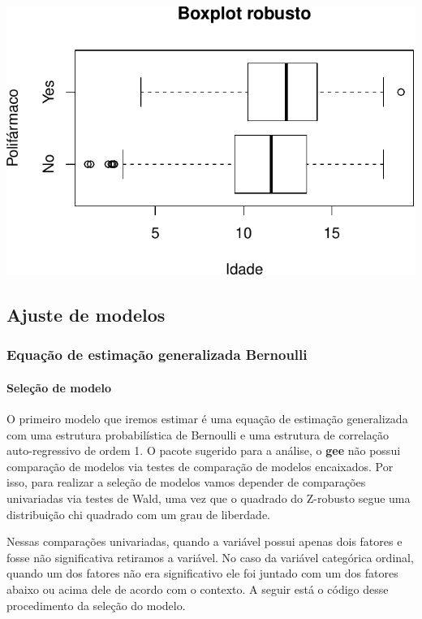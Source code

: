\documentclass[
  11pt,
]{article}
\begin{document}
\begin{center}\includegraphics{lista3_files/figure-latex/unnamed-chunk-3-1} \end{center}

\hypertarget{ajuste-de-modelos}{%
\subsection{Ajuste de modelos}\label{ajuste-de-modelos}}

\hypertarget{equauxe7uxe3o-de-estimauxe7uxe3o-generalizada-bernoulli}{%
\subsubsection{Equação de estimação generalizada Bernoulli}\label{equauxe7uxe3o-de-estimauxe7uxe3o-generalizada-bernoulli}}

\hypertarget{seleuxe7uxe3o-de-modelo}{%
\paragraph{Seleção de modelo}\label{seleuxe7uxe3o-de-modelo}}

O primeiro modelo que iremos estimar é uma equação de estimação generalizada com uma estrutura probabilística de Bernoulli e uma estrutura de correlação auto-regressivo de ordem 1. O pacote sugerido para a análise, o \textbf{gee} não possui comparação de modelos via testes de comparação de modelos encaixados. Por isso, para realizar a seleção de modelos vamos depender de comparações univariadas via testes de Wald, uma vez que o quadrado do Z-robusto segue uma distribuição chi quadrado com um grau de liberdade.

Nessas comparações univariadas, quando a variável possui apenas dois fatores e fosse não significativa retiramos a variável. No caso da variável categórica ordinal, quando um dos fatores não era significativo ele foi juntado com um dos fatores abaixo ou acima dele de acordo com o contexto. A seguir está o código desse procedimento da seleção do modelo.
\end{document}
